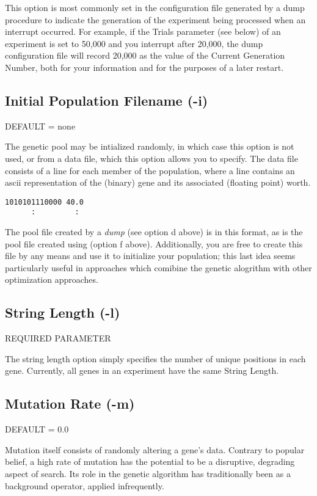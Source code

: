 This option is most commonly set in the configuration file generated by a dump
procedure to indicate the generation of the experiment being processed when an
interrupt occurred.  For example, if the Trials parameter (see below) of an
experiment is set to 50,000 and you interrupt after 20,000, the dump configuration
file will record 20,000 as the value of the Current Generation Number, both for
your information and for the purposes of a later restart.



\subsection*{Initial Population Filename (-i)}
DEFAULT = none

The genetic pool may be intialized randomly, in which case this option is not
used, or from a data file, which this option allows you to specify.  The data file
consists of a line for each member of the population, where a line contains an ascii
representation of the (binary) gene and its associated (floating point) worth.

\begin{verbatim}
1010101110000 40.0
	  :         :
\end{verbatim}

The pool file created by a {\it dump} (see option d above) is in this format, as is
the pool file created using (option f above).  Additionally, you are free to 
create this file by any means and use it to initialize your population; this
last idea seems particularly useful in approaches which comibine the genetic
alogrithm with other optimization approaches.


\subsection*{String Length (-l)}
REQUIRED PARAMETER

The string length option simply specifies the number of unique positions in each
gene.  Currently, all genes in an experiment have the same String Length.



\subsection*{Mutation Rate (-m)}
DEFAULT = 0.0

Mutation itself consists of randomly altering a gene's data.  Contrary to 
popular belief, a high rate of mutation has the potential to be a disruptive,
degrading aspect of search.  Its role in the genetic algorithm has traditionally
been as a background operator, applied infrequently.  

